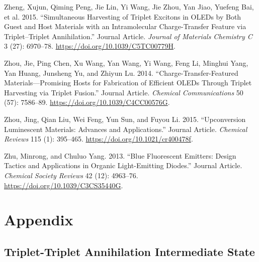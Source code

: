 \documentclass[
  letterpaper,
  DIV=11,
  numbers=noendperiod,
  oneside]{scrreprt}
\newlength{\cslhangindent}
\newlength{\cslentryspacingunit} %
\newenvironment{CSLReferences}[2] %
 {%
  \setlength{\parindent}{0pt}
  \ifodd #1
  \let\oldpar\par
  \def\par{\hangindent=\cslhangindent\oldpar}
  \fi
  \setlength{\parskip}{#2\cslentryspacingunit}
 }%
 {}
\begin{document}
\begin{CSLReferences}{1}{0}
\leavevmode{}%
Zheng, Xujun, Qiming Peng, Jie Lin, Yi Wang, Jie Zhou, Yan Jiao, Yuefeng
Bai, et al. 2015. {``Simultaneous Harvesting of Triplet Excitons in
OLEDs by Both Guest and Host Materials with an Intramolecular
Charge-Transfer Feature via Triplet--Triplet Annihilation.''} Journal
Article. \emph{Journal of Materials Chemistry C} 3 (27): 6970--78.
\url{https://doi.org/10.1039/C5TC00779H}.

\leavevmode{}%
Zhou, Jie, Ping Chen, Xu Wang, Yan Wang, Yi Wang, Feng Li, Minghui Yang,
Yan Huang, Junsheng Yu, and Zhiyun Lu. 2014. {``Charge-Transfer-Featured
Materials---Promising Hosts for Fabrication of Efficient OLEDs Through
Triplet Harvesting via Triplet Fusion.''} Journal Article.
\emph{Chemical Communications} 50 (57): 7586--89.
\url{https://doi.org/10.1039/C4CC00576G}.

\leavevmode{}%
Zhou, Jing, Qian Liu, Wei Feng, Yun Sun, and Fuyou Li. 2015.
{``Upconversion Luminescent Materials: Advances and Applications.''}
Journal Article. \emph{Chemical Reviews} 115 (1): 395--465.
\url{https://doi.org/10.1021/cr400478f}.

\leavevmode{}%
Zhu, Minrong, and Chuluo Yang. 2013. {``Blue Fluorescent Emitters:
Design Tactics and Applications in Organic Light-Emitting Diodes.''}
Journal Article. \emph{Chemical Society Reviews} 42 (12): 4963--76.
\url{https://doi.org/10.1039/C3CS35440G}.

\end{CSLReferences}

\appendix
{}

\hypertarget{appendix}{%
\chapter{Appendix}\label{appendix}}

\hypertarget{apen-A}{%
\section{Triplet-Triplet Annihilation Intermediate State}\label{apen-A}}
\end{document}
